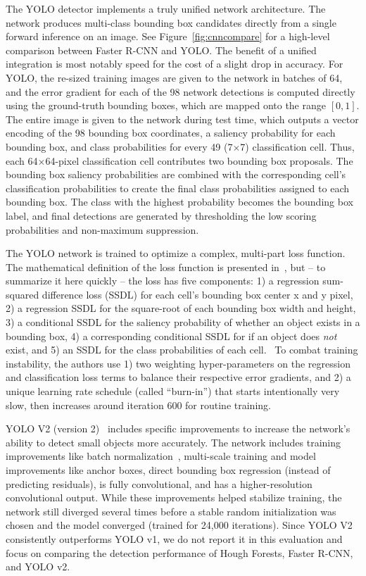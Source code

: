 The YOLO detector implements a truly unified network architecture.  The network produces multi-class bounding box candidates directly from a single forward inference on an image.  See Figure~\ref{fig:cnncompare} for a high-level comparison between Faster R-CNN and YOLO.  The benefit of a unified integration is most notably speed for the cost of a slight drop in accuracy.  For YOLO, the re-sized training images are given to the network in batches of 64, and the error gradient for each of the 98 network detections is computed directly using the ground-truth bounding boxes, which are mapped onto the range $[0, 1]$.  The entire image is given to the network during test time, which outputs a vector encoding of the 98 bounding box coordinates, a saliency probability for each bounding box, and class probabilities for every 49 (7$\times$7) classification cell. Thus, each 64$\times$64-pixel classification cell contributes two bounding box proposals.  The bounding box saliency probabilities are combined with the corresponding cell's classification probabilities to create the final class probabilities assigned to each bounding box.  The class with the highest probability becomes the bounding box label, and final detections are generated by thresholding the low scoring probabilities and non-maximum suppression.

The YOLO network is trained to optimize a complex, multi-part loss function.  The mathematical definition of the loss function is presented in~\cite{redmon_you_2016}, but -- to summarize it here quickly -- the loss has five components: 1) a regression sum-squared difference loss (SSDL) for each cell's bounding box center x and y pixel, 2) a regression SSDL for the square-root of each bounding box width and height, 3) a conditional SSDL for the saliency probability of whether an object exists in a bounding box, 4) a corresponding conditional SSDL for if an object does \textit{not} exist, and 5) an SSDL for the class probabilities of each cell.~\cite{redmon_you_2016}  To combat training instability, the authors use 1) two weighting hyper-parameters on the regression and classification loss terms to balance their respective error gradients, and 2) a unique learning rate schedule (called ``burn-in'') that starts intentionally very slow, then increases around iteration 600 for routine training.

YOLO V2 (version 2)~\cite{redmon_yolo9000:_2016} includes specific improvements to increase the network's ability to detect small objects more accurately.  The network includes training improvements like batch normalization~\cite{ioffe_batch_2015}, multi-scale training and model improvements like anchor boxes, direct bounding box regression (instead of predicting residuals), is fully convolutional, and has a higher-resolution convolutional output.  While these improvements helped stabilize training, the network still diverged several times before a stable random initialization was chosen and the model converged (trained for 24,000 iterations).  Since YOLO V2 consistently outperforms YOLO v1, we do not report it in this evaluation and focus on comparing the detection performance of Hough Forests, Faster R-CNN, and YOLO v2.

